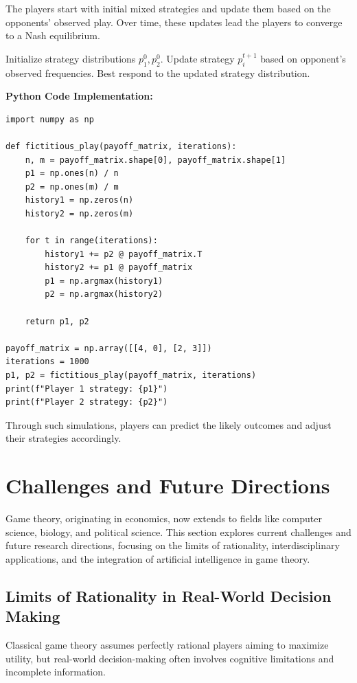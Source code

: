 \documentclass[12pt]{book} %
\begin{document}
The players start with initial mixed strategies and update them based on the opponents' observed play. Over time, these updates lead the players to converge to a Nash equilibrium.
\FloatBarrier
\begin{algorithm}[H]
\caption{Fictitious Play Algorithm}
\begin{algorithmic}[1]
\State Initialize strategy distributions $p_1^0, p_2^0$.
        \State Update strategy $p_i^{t+1}$ based on opponent's observed frequencies.
        \State Best respond to the updated strategy distribution.
    \EndFor
\EndFor
\end{algorithmic}
\end{algorithm}
\FloatBarrier

\textbf{Python Code Implementation:}
\FloatBarrier
\begin{lstlisting}
import numpy as np

def fictitious_play(payoff_matrix, iterations):
    n, m = payoff_matrix.shape[0], payoff_matrix.shape[1]
    p1 = np.ones(n) / n
    p2 = np.ones(m) / m
    history1 = np.zeros(n)
    history2 = np.zeros(m)
    
    for t in range(iterations):
        history1 += p2 @ payoff_matrix.T
        history2 += p1 @ payoff_matrix
        p1 = np.argmax(history1)
        p2 = np.argmax(history2)
    
    return p1, p2

payoff_matrix = np.array([[4, 0], [2, 3]])
iterations = 1000
p1, p2 = fictitious_play(payoff_matrix, iterations)
print(f"Player 1 strategy: {p1}")
print(f"Player 2 strategy: {p2}")
\end{lstlisting}
\FloatBarrier

Through such simulations, players can predict the likely outcomes and adjust their strategies accordingly.


\section{Challenges and Future Directions}
Game theory, originating in economics, now extends to fields like computer science, biology, and political science. This section explores current challenges and future research directions, focusing on the limits of rationality, interdisciplinary applications, and the integration of artificial intelligence in game theory.

\subsection{Limits of Rationality in Real-World Decision Making}
Classical game theory assumes perfectly rational players aiming to maximize utility, but real-world decision-making often involves cognitive limitations and incomplete information.
\end{document}
